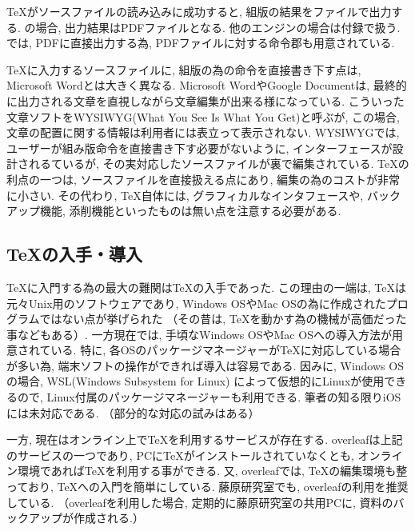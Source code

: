 \documentclass[12pt,xelatex,ja=standard]{bxjsarticle}
\begin{document}
\TeX がソースファイルの読み込みに成功すると,
組版の結果をファイルで出力する.
\XeLaTeX の場合,
出力結果はPDFファイルとなる.
他のエンジンの場合は付録で扱う.
\XeLaTeX では, PDFに直接出力する為,
PDFファイルに対する命令郡も用意されている.

\TeX に入力するソースファイルに,
組版の為の命令を直接書き下す点は,
Microsoft Wordとは大きく異なる.
Microsoft WordやGoogle Documentは,
最終的に出力される文章を直視しながら文章編集が出来る様になっている.
こういった文章ソフトをWYSIWYG(What You See Is What You Get)と呼ぶが,
この場合, 文章の配置に関する情報は利用者には表立って表示されない.
WYSIWYGでは, ユーザーが組み版命令を直接書き下す必要がないように,
インターフェースが設計されるているが,
その実対応したソースファイルが裏で編集されている.
\TeX の利点の一つは,
ソースファイルを直接扱える点にあり,
編集の為のコストが非常に小さい.
その代わり,
\TeX 自体には, グラフィカルなインタフェースや,
バックアップ機能, 添削機能といったものは無い点を注意する必要がある.

\subsection{\TeX の入手・導入}
\TeX に入門する為の最大の難関は\TeX の入手であった.
この理由の一端は,
\TeX は元々Unix用のソフトウェアであり,
Windows OSやMac OSの為に作成されたプログラムではない点が挙げられた
（その昔は, \TeX を動かす為の機械が高価だった事などもある）.
一方現在では,
手頃なWindows OSやMac OSへの導入方法が用意されている.
特に, 各OSのパッケージマネージャーが\TeX に対応している場合が多い為,
端末ソフトの操作ができれば導入は容易である.
因みに, Windows OSの場合,
WSL(Windows Subsystem for Linux)
によって仮想的にLinuxが使用できるので,
Linux付属のパッケージマネージャーも利用できる.
筆者の知る限りiOSには未対応である.
（部分的な対応の試みはある）

一方, 現在はオンライン上で\TeX を利用するサービスが存在する.
overleafは上記のサービスの一つであり,
PCに\TeX がインストールされていなくとも,
オンライン環境であれば\TeX を利用する事ができる.
又, overleafでは,
\TeX の編集環境も整っており,
\TeX への入門を簡単にしている.
藤原研究室でも,
overleafの利用を推奨している.
（overleafを利用した場合,
定期的に藤原研究室の共用PCに,
資料のバックアップが作成される.）
\end{document}
